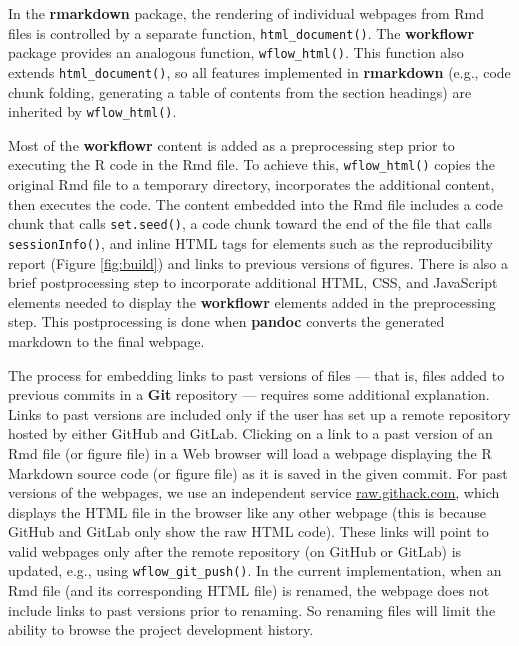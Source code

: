 \documentclass[9pt,a4paper]{extarticle}
\begin{document}
In the \textbf{rmarkdown} package, the rendering of individual webpages from Rmd
files is controlled by a separate function, \texttt{html\_document()}. The
 \textbf{workflowr} package provides an analogous function, \texttt{wflow\_html()}. This
function also extends \texttt{html\_document()}, so all features implemented in
 \textbf{rmarkdown} (e.g., code chunk folding, generating a table of contents from
the section headings) are inherited by \texttt{wflow\_html()}.

Most of the \textbf{workflowr} content is added as a preprocessing step prior to
executing the R code in the Rmd file. To achieve this, \texttt{wflow\_html()}
copies the original Rmd file to a temporary directory, incorporates the
additional content, then executes the code. The content embedded into
the Rmd file includes a code chunk that calls \texttt{set.seed()}, a code chunk
toward the end of the file that calls \texttt{sessionInfo()}, and inline HTML
tags for elements such as the reproducibility report (Figure \ref{fig:build}) and
links to previous versions of figures. There is also a brief
postprocessing step to incorporate additional HTML, CSS, and JavaScript
elements needed to display the \textbf{workflowr} elements added in the
preprocessing step. This postprocessing is done when \textbf{pandoc} converts the
generated markdown to the final webpage.

The process for embedding links to past versions of files --- that is,
files added to previous commits in a \textbf{Git} repository --- requires some
additional explanation. Links to past versions are included only if the
user has set up a remote repository hosted by either GitHub and GitLab.
Clicking on a link to a past version of an Rmd file (or figure file) in
a Web browser will load a webpage displaying the R Markdown source code
(or figure file) as it is saved in the given commit. For past versions
of the webpages, we use an independent service
\href{https://raw.githack.com/}{raw.githack.com}, which displays the
HTML file in the browser like any other webpage (this is because GitHub
and GitLab only show the raw HTML code). These links will point to valid
webpages only after the remote repository (on GitHub or GitLab) is
updated, e.g., using \texttt{wflow\_git\_push()}. In the current implementation,
when an Rmd file (and its corresponding HTML file) is renamed, the
webpage does not include links to past versions prior to renaming. So
renaming files will limit the ability to browse the project development
history.
\end{document}
